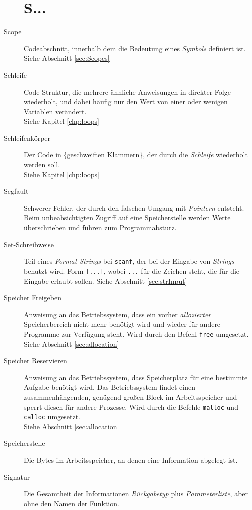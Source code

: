\begin{appendices}
\begin{description}
\section*{S...}
\item[Scope] Codeabschnitt, innerhalb dem die Bedeutung eines \emph{Symbols} definiert ist.\\
	Siehe Abschnitt \ref{sec:Scopes}
\item[Schleife] Code-Struktur, die mehrere ähnliche Anweisungen in direkter Folge wiederholt, und dabei
	häufig nur den Wert von einer oder wenigen Variablen verändert.\\
	Siehe Kapitel \ref{chp:loops}
\item[Schleifenkörper] Der Code in \{geschweiften Klammern\}, der durch die \emph{Schleife} wiederholt
	werden soll.\\
	Siehe Kapitel \ref{chp:loops}
\item[Segfault] Schwerer Fehler, der durch den falschen Umgang mit \emph{Pointern} entsteht. Beim
	unbeabsichtigten Zugriff auf eine Speicherstelle werden Werte überschrieben und führen zum
	Programmabsturz.
\item[Set-Schreibweise] Teil eines \emph{Format-Strings} bei \texttt{scanf}, der bei der
	Eingabe von \emph{Strings} benutzt wird. Form \texttt{[...]}, wobei \texttt{...} für die
	Zeichen steht, die für die Eingabe erlaubt sollen.\newline
	Siehe Abschnitt \ref{sec:strInput}
\item[Speicher Freigeben] Anweisung an das Betriebssystem, dass ein vorher \emph{allozierter}
	Speicherbereich nicht mehr benötigt wird und wieder für andere Programme zur Verfügung steht. Wird
	durch den Befehl \texttt{free} umgesetzt.\\
	Siehe Abschnitt \ref{sec:allocation}
\item[Speicher Reservieren] Anweisung an das Betriebssystem, dass Speicherplatz für eine bestimmte
	Aufgabe benötigt wird. Das Betriebssystem findet einen zusammenhängenden, genügend großen Block im
	Arbeitsspeicher und sperrt diesen für andere Prozesse. Wird durch die Befehle \texttt{malloc} und
	\texttt{calloc} umgesetzt.\\
	Siehe Abschnitt \ref{sec:allocation}
\item[Speicherstelle] Die Bytes im Arbeitsspeicher, an denen eine Information abgelegt ist.
\item[Signatur] Die Gesamtheit der Informationen \emph{Rückgabetyp} plus \emph{Parameterliste}, aber
	ohne den Namen der Funktion.\\

\end{description}
\end{appendices}
